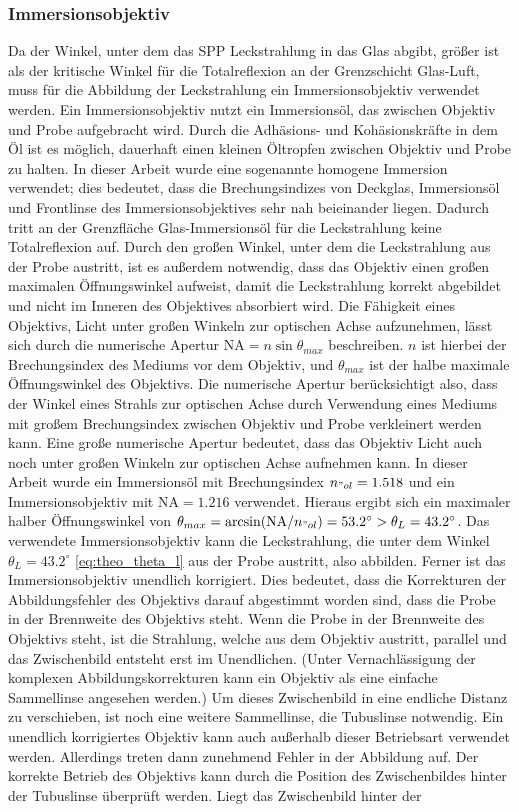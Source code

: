 \documentclass[titlepage,  ngerman]{article}
\begin{document}
	\subsubsection{Immersionsobjektiv}
	Da der Winkel, unter dem das SPP Leckstrahlung in das Glas abgibt, größer ist als der kritische Winkel für die Totalreflexion an der Grenzschicht Glas-Luft, muss für die Abbildung der Leckstrahlung ein Immersionsobjektiv verwendet werden. Ein Immersionsobjektiv nutzt ein Immersionsöl, das zwischen Objektiv und Probe aufgebracht wird. Durch die Adhäsions- und Kohäsionskräfte in dem Öl ist es möglich, dauerhaft einen kleinen Öltropfen zwischen Objektiv und Probe zu halten. In dieser Arbeit  wurde eine sogenannte homogene Immersion verwendet; dies bedeutet, dass die Brechungsindizes von Deckglas, Immersionsöl und Frontlinse des Immersionsobjektives sehr nah beieinander liegen. Dadurch tritt an der Grenzfläche Glas-Immersionsöl für die Leckstrahlung keine Totalreflexion auf. Durch den großen Winkel, unter dem die Leckstrahlung aus der Probe austritt, ist es außerdem notwendig, dass das Objektiv einen großen maximalen Öffnungswinkel aufweist, damit die Leckstrahlung korrekt abgebildet und nicht im Inneren des Objektives absorbiert wird. Die Fähigkeit eines Objektivs, Licht unter großen Winkeln zur optischen Achse aufzunehmen, lässt sich durch die numerische Apertur $\mathrm{NA} = n\sin\theta_{max}$ beschreiben. $n$ ist hierbei der Brechungsindex des Mediums vor dem Objektiv, und $\theta_{max}$ ist der halbe maximale Öffnungswinkel des Objektivs. Die numerische Apertur berücksichtigt also, dass der Winkel eines Strahls zur optischen Achse durch Verwendung eines Mediums mit großem Brechungsindex zwischen Objektiv und Probe verkleinert werden kann. Eine große numerische Apertur bedeutet, dass das Objektiv Licht auch noch unter großen Winkeln zur optischen Achse aufnehmen kann. In dieser Arbeit wurde ein Immersionsöl mit Brechungsindex $n_{"ol} = 1.518$ und ein Immersionsobjektiv mit $\mathrm{NA} = 1.216$ verwendet. Hieraus ergibt sich ein maximaler halber Öffnungswinkel von $\theta_{max} = \arcsin(\mathrm{NA} / n_{"ol}) = 53.2^\circ > \theta_L = 43.2^\circ$. Das verwendete Immersionsobjektiv kann die Leckstrahlung, die unter dem Winkel $\theta_L = 43.2^\circ$ \eqref{eq:theo_theta_l} aus der Probe austritt, also abbilden. Ferner ist das Immersionsobjektiv unendlich korrigiert. Dies bedeutet, dass die Korrekturen der Abbildungsfehler des Objektivs darauf abgestimmt worden sind, dass die Probe in der Brennweite des Objektivs steht. Wenn die Probe in der Brennweite des Objektivs steht, ist die Strahlung, welche aus dem Objektiv austritt, parallel und das Zwischenbild entsteht erst im Unendlichen. (Unter Vernachlässigung der komplexen Abbildungskorrekturen kann ein Objektiv als eine einfache Sammellinse angesehen werden.) Um dieses Zwischenbild in eine endliche Distanz zu verschieben, ist noch eine weitere Sammellinse, die Tubuslinse notwendig. Ein unendlich korrigiertes Objektiv kann auch außerhalb dieser Betriebsart verwendet werden. Allerdings treten dann zunehmend Fehler in der Abbildung auf. Der korrekte Betrieb des Objektivs kann durch die Position des Zwischenbildes hinter der Tubuslinse überprüft werden. Liegt das Zwischenbild hinter der 
\end{document}
